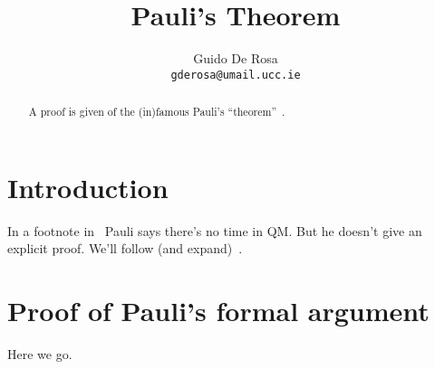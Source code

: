 \documentclass[a4paper,12pt]{article}
\author{Guido De Rosa \\ \small\tt{gderosa@umail.ucc.ie}}
\title{Pauli's Theorem}
\begin{document}
\maketitle

\begin{abstract}
A proof is given of the (in)famous Pauli's ``theorem''~\cite[footnote~2]{PauliFootnote}.
\end{abstract}

\section{Introduction}
In a footnote in~\cite{PauliFootnote} Pauli says there's no time in QM. But he
doesn't give an explicit proof. We'll follow (and expand)~\cite{Galapon2002}.

\section{Proof of Pauli's formal argument}\label{proof}
Here we go.



\end{document}
